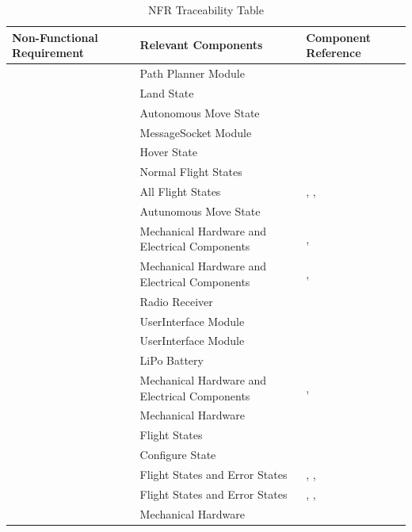 \documentclass[12pt, titlepage]{article}
\begin{document}
\begin{table}[!h]
\begin{center}
\caption {NFR Traceability Table}
\label{tab:NFR_DesignTrace}
\begin{tabular}{ | m{2.5cm} | m{7.5cm} | m{6.5cm} | } 
\hline
Non-Functional Requirement & Relevant Components & Component Reference \\
\hline
\nameref{PERF_001} & Path Planner Module & \nameref{MIS_PATH_PLANNER} \\ \hline
\nameref{PERF_002} & Land State & \nameref{FlightStates} \\ \hline
\nameref{PERF_003} & Autonomous Move State & \nameref{FlightStates} \\ \hline
\nameref{PERF_004} & MessageSocket Module & \nameref{MIS_MESSAGE_SOCKET} \\ \hline
\nameref{PERF_005} & Hover State & \nameref{FlightStates} \\ \hline
\nameref{PERF_006} & Normal Flight States & \nameref{FlightStates} \\ \hline
\nameref{PERF_007} & All Flight States & \nameref{FlightStates}, \nameref{NonFlightStates}, \nameref{ErrorStates} \\ \hline
\nameref{PERF_008} & Autunomous Move State & \nameref{FlightStates} \\ \hline
\nameref{DES_001} & Mechanical Hardware and Electrical Components & \nameref{sec:mechHardware}, \nameref{sec:elecComponents} \\ \hline
\nameref{STD_001} & Mechanical Hardware and Electrical Components & \nameref{sec:mechHardware}, \nameref{sec:elecComponents} \\ \hline
\nameref{STD_002} & Radio Receiver & \nameref{sec:elecComponents} \\ \hline
\nameref{SEC_001} & UserInterface Module & \nameref{MIS_USER_INTERFACE} \\ \hline
\nameref{SEC_002} & UserInterface Module & \nameref{MIS_USER_INTERFACE} \\ \hline
\nameref{MTNC_001} & LiPo Battery & \nameref{sec:elecComponents} \\ \hline
\nameref{MTNC_002} & Mechanical Hardware and Electrical Components & \nameref{sec:mechHardware}, \nameref{sec:elecComponents} \\ \hline
\nameref{MTNC_003} & Mechanical Hardware & \nameref{sec:mechHardware} \\ \hline
\nameref{SAFE_001} & Flight States & \nameref{FlightStates} \\ \hline
\nameref{SAFE_002} & Configure State & \nameref{NonFlightStates} \\ \hline
\nameref{SAFE_003} & Flight States and Error States & \nameref{FlightStates}, \nameref{NonFlightStates}, \nameref{ErrorStates} \\ \hline
\nameref{SAFE_004} & Flight States and Error States & \nameref{FlightStates}, \nameref{NonFlightStates}, \nameref{ErrorStates} \\ \hline
\nameref{SAFE_005} & Mechanical Hardware & \nameref{sec:mechHardware} \\ \hline
\end{tabular}
\end{center}
\end{table}
\end{document}
